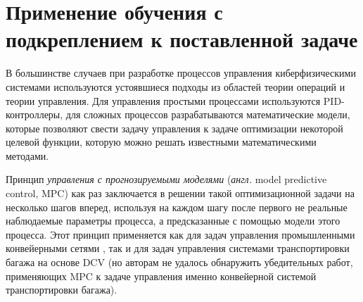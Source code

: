 \documentclass[specification,annotation,times]{itmo-student-thesis}
\theoremstyle{definition}
\begin{document}








\section{Применение обучения с подкреплением к поставленной задаче}

В большинстве случаев при разработке процессов управления киберфизическими
системами используются устоявшиеся подходы из областей теории операций и теории
управления. Для управления простыми процессами используются
PID-контроллеры\cite{aastrom2006advanced}, для сложных процессов разрабатываются
математические модели, которые позволяют свести задачу управления к задаче
оптимизации некоторой целевой функции, которую можно решать известными
математическими методами.

Принцип \textit{управления с прогнозируемыми моделями}
(\textit{англ.} model predictive control, MPC) как раз заключается в решении
такой оптимизационной задачи на несколько шагов вперед, используя на каждом шагу
после первого не реальные наблюдаемые параметры процесса, а предсказанные с
помощью модели этого процесса. Этот принцип применяется как для задач управления
промышленными конвейерными сетями \cite{cataldo2016dynamic, luo2015energy}, так
и для задач управления системами транспортировки багажа на основе DCV
\cite{tarau2010model, zeinaly2015integrated} (но авторам не удалось обнаружить
убедительных работ, применяющих MPC к задаче управления именно конвейерной
системой транспортировки багажа).
\end{document}
